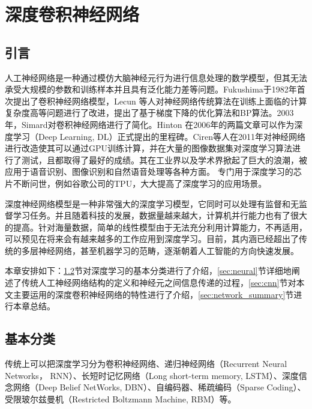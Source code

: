 
\chapter{深度卷积神经网络}
\label{sec:network}
\section{引言}

人工神经网络是一种通过模仿大脑神经元行为进行信息处理的数学模型，但其无法承受大规模的参数和训练样本并且具有泛化能力差等问题。Fukushima于1982年首次提出了卷积神经网络模型，Lecun 等人对神经网络传统算法在训练上面临的计算复杂度高等问题进行了改进，提出了基于梯度下降的优化算法和BP算法。2003年，Simard对卷积神经网络进行了简化。Hinton 在2006年的两篇文章可以作为深度学习（Deep Learning, DL）正式提出的里程碑。Ciren等人在2011年对神经网络进行改造使其可以通过GPU训练计算，并在大量的图像数据集对深度学习算法进行了测试，且都取得了最好的成绩。其在工业界以及学术界掀起了巨大的浪潮，被应用于语音识别、图像识别和自然语音处理等各种方面。 专门用于深度学习的芯片不断问世，例如谷歌公司的TPU，大大提高了深度学习的应用场景。

深度神经网络模型是一种非常强大的深度学习模型，它同时可以处理有监督和无监督学习任务。并且随着科技的发展，数据量越来越大，计算机并行能力也有了很大的提高。针对海量数据，简单的线性模型由于无法充分利用计算能力，不再适用，可以预见在将来会有越来越多的工作应用到深度学习。目前，其内涵已经超出了传统的多层神经网络，甚至机器学习的范畴，逐渐朝着人工智能的方向快速发展。

本章安排如下：\ref{sec:network_classification}节对深度学习的基本分类进行了介绍，\ref{sec:neural}节详细地阐述了传统人工神经网络结构的定义和神经元之间信息传递的过程，\ref{sec:cnn}节对本文主要运用的深度卷积神经网络的特性进行了介绍，\ref{sec:network_summary}节进行本章总结。
\section{基本分类}
\label{sec:network_classification}
传统上可以把深度学习分为卷积神经网络、递归神经网络（Recurrent Neural Networks， RNN）、长短时记忆网络（Long short-term memory, LSTM）、深度信念网络（Deep Belief NetWorks, DBN）、自编码器、稀疏编码（Sparse Coding）、受限玻尔兹曼机（Restricted Boltzmann Machine, RBM）等。

